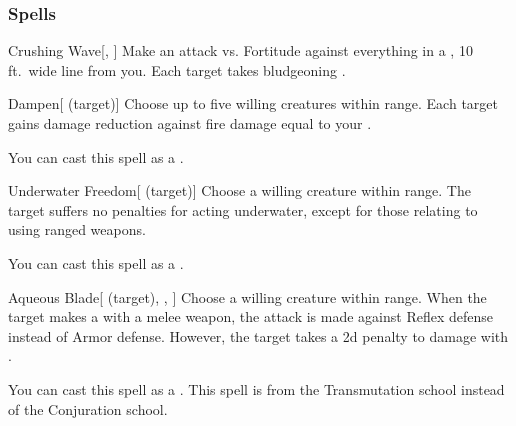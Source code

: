 \subsubsection{Spells}


\lowercase{\hypertarget{spell:Crushing Wave}{}}\label{spell:Crushing Wave}
\begin{ability}[\nth{1}]{\hypertarget{spell:Crushing Wave}{Crushing Wave}}[, ]
Make an attack vs. Fortitude against everything in a \arealarge, 10 ft.\ wide line from you.
\hit Each target takes bludgeoning .
\end{ability}
\vspace{0.25em}



\lowercase{\hypertarget{spell:Dampen}{}}\label{spell:Dampen}
\begin{ability}[\nth{1}]{\hypertarget{spell:Dampen}{Dampen}}[ (target)]
Choose up to five willing creatures within \rngclose range.
Each target gains damage reduction against fire damage equal to your .

You can cast this spell as a .
\end{ability}
\vspace{0.25em}



\lowercase{\hypertarget{spell:Underwater Freedom}{}}\label{spell:Underwater Freedom}
\begin{ability}[\nth{1}]{\hypertarget{spell:Underwater Freedom}{Underwater Freedom}}[ (target)]
Choose a willing creature within \rngclose range.
The target suffers no penalties for acting underwater, except for those relating to using ranged weapons.

You can cast this spell as a .
\end{ability}
\vspace{0.25em}



\lowercase{\hypertarget{spell:Aqueous Blade}{}}\label{spell:Aqueous Blade}
\begin{ability}[\nth{2}]{\hypertarget{spell:Aqueous Blade}{Aqueous Blade}}[ (target), , ]
Choose a willing creature within \rngclose range.
When the target makes a  with a melee weapon, the attack is made against Reflex defense instead of Armor defense.
However, the target takes a \minus2d penalty to damage with .

You can cast this spell as a .
This spell is from the Transmutation school instead of the Conjuration school.
\end{ability}
\vspace{0.25em}



